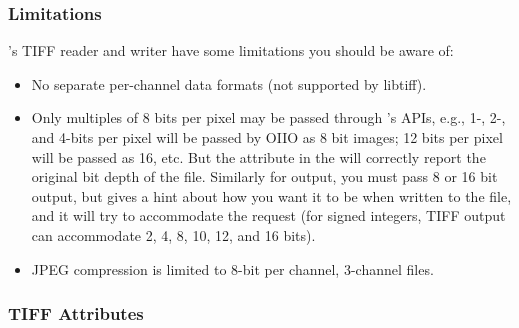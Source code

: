 \subsubsection*{Limitations}

\product's TIFF reader and writer have some limitations you should be
aware of:
\begin{itemize}
\item No separate per-channel data formats (not supported by {\cf
  libtiff}).
\item Only multiples of 8 bits per pixel may be passed through
  \product's APIs, e.g., 1-, 2-, and 4-bits per pixel will be passed
  by OIIO as 8 bit images; 12 bits per pixel will be passed as 16,
  etc.  But the  attribute in the \ImageSpec
  will correctly report the original bit depth of the file. Similarly
  for output, you must pass 8 or 16 bit output, but 
  gives a hint about how you want it to be when written to the file, and
  it will try to accommodate the request (for signed integers,
  TIFF output can accommodate 2, 4, 8, 10, 12, and 16 bits).
\item JPEG compression is limited to 8-bit per channel, 3-channel files.
\end{itemize}


\newpage 
\subsubsection*{TIFF Attributes}


